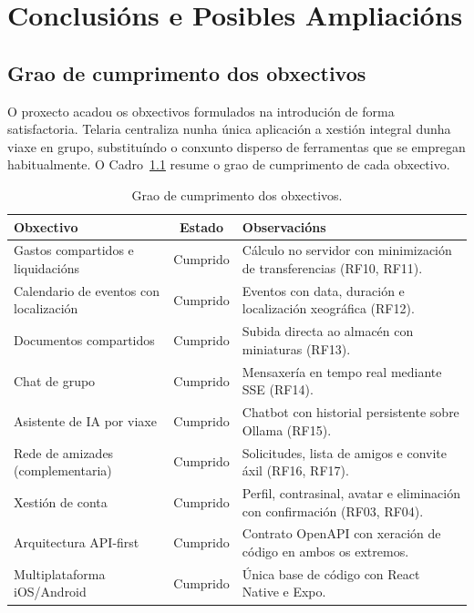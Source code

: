 \chapter{Conclusións e Posibles Ampliacións}

\section{Grao de cumprimento dos obxectivos}

O proxecto acadou os obxectivos formulados na introdución de forma satisfactoria. Telaria centraliza nunha única
aplicación a xestión integral dunha viaxe en grupo, substituíndo o conxunto disperso de
ferramentas que se empregan habitualmente. O Cadro~\ref{tab:obxectivos} resume o grao de
cumprimento de cada obxectivo.

\begin{table}[H]
  \centering
  \caption{Grao de cumprimento dos obxectivos.}
  \label{tab:obxectivos}
  \begin{tabularx}{\textwidth}{@{}p{6.2cm}cX@{}}
    \toprule
    \textbf{Obxectivo} & \textbf{Estado} & \textbf{Observacións} \\
    \midrule
    Gastos compartidos e liquidacións & Cumprido & Cálculo no servidor con minimización de transferencias (RF10, RF11). \\[3pt]
    Calendario de eventos con localización & Cumprido & Eventos con data, duración e localización xeográfica (RF12). \\[3pt]
    Documentos compartidos & Cumprido & Subida directa ao almacén con miniaturas (RF13). \\[3pt]
    Chat de grupo & Cumprido & Mensaxería en tempo real mediante SSE (RF14). \\[3pt]
    Asistente de IA por viaxe & Cumprido & Chatbot con historial persistente sobre Ollama (RF15). \\[3pt]
    Rede de amizades (complementaria) & Cumprido & Solicitudes, lista de amigos e convite áxil (RF16, RF17). \\[3pt]
    Xestión de conta & Cumprido & Perfil, contrasinal, avatar e eliminación con confirmación (RF03, RF04). \\[3pt]
    Arquitectura API-first & Cumprido & Contrato OpenAPI con xeración de código en ambos os extremos. \\[3pt]
    Multiplataforma iOS/Android & Cumprido & Única base de código con React Native e Expo. \\
    \bottomrule
  \end{tabularx}
\end{table}

